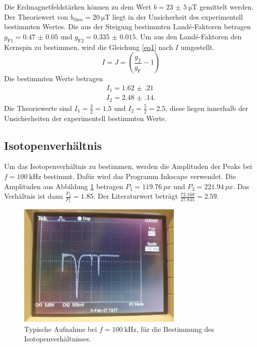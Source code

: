 \FloatBarrier
Die Erdmagnetfeldstärken können zu dem Wert $b=\SI{23(5)}{\micro\tesla}$ gemittelt werden. Der Theoriewert von $b_{\text{theo}}=\SI{20}{\micro\tesla}$
liegt in der Unsicherheit des experimentell bestimmten Wertes. 
Die aus der Steigung bestimmten Landé-Faktoren betragen $g_{\text{F1}}=\num{0.47(5)}$ und $g_{\text{F2}} = \num{0.335(15)}$.
Um aus den Landé-Faktoren den Kernspin zu bestimmen, wird die Gleichung \ref{eq1} nach $I$ umgestellt.
\begin{equation*}
  I=J=\left(\frac{g_{\text{J}}}{g_{\text{F}}}-1\right)
\end{equation*}
Die bestimmten Werte betragen 
\begin{gather*}
  I_1 = \num{1.62(21)}\\
  I_2 = \num{2.48(14)}.
\end{gather*}
Die Theoriewerte sind $I_1 = \frac{3}{2}= \num{1.5}$ und $I_2 = \frac{5}{2}=\num{2.5}$, diese liegen innerhalb der Unsicherheiten der
experimentell bestimmten Werte.
\subsection{Isotopenverhältnis}
Um das Isotopenverhältnis zu bestimmen, werden die Amplituden der Peaks bei $f= \SI{100}{\kilo\hertz}$ bestimmt.
Dafür wird das Programm Inkscape verwendet. Die Amplituden aus Abbildung \ref{fig:Isotopenverhältnis} 
betragen $P_{1} = \SI{119.76}{px}$ und $P_{2} = \SI{221.94}{px}$. Das Verhältnis ist dann $\frac{P_2}{P_1} = \num{1.85}$.
Der Literaturwert beträgt $\frac{\num{72.168}}{\num{27.835}} = \num{2.59}$.
\FloatBarrier
\begin{figure}
  \centering
  \includegraphics[width = 0.7\textwidth,keepaspectratio]{figure/Oszibild.pdf}
  \caption{Typische Aufnahme bei $f=\SI{100}{\kilo\hertz}$, für die Bestimmung des Isotopenverhältnisses.}
  \label{fig:Isotopenverhältnis}
\end{figure}
\newpage
